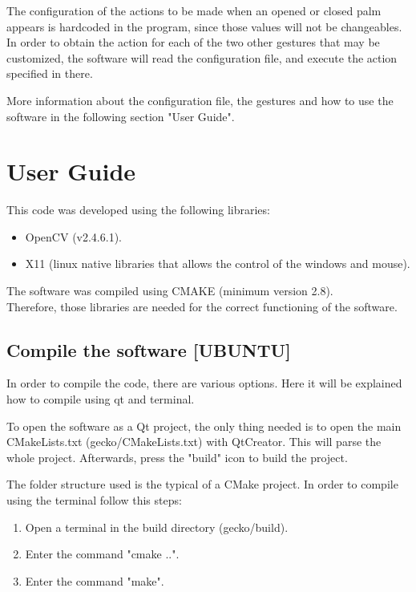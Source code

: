 \documentclass{article}
\begin{document}
\begin{center}
\end{center}

The configuration of the actions to be made when an opened or closed palm appears is hardcoded in the program, since those values will not be changeables. In order to obtain the action for each of the two other gestures that may be customized, the software will read the configuration file, and execute the action specified in there. 

More information about the configuration file, the gestures and how to use the software in the following section "User Guide". 

\section{User Guide}
This code was developed using the following libraries: 
\begin{itemize}
\item OpenCV (v2.4.6.1).
\item X11 (linux native libraries that allows the control of the windows and mouse). 
\end{itemize}
The software was compiled using CMAKE (minimum version 2.8).
\\[0.5cm]
Therefore, those libraries are needed for the correct functioning of the software. 


\subsection{Compile the software [UBUNTU]}

In order to compile the code, there are various options. Here it will be explained how to compile using qt and terminal. 

To open the software as a Qt project, the only thing needed is to open the main CMakeLists.txt (gecko/CMakeLists.txt) with QtCreator. This will parse the whole project. 
Afterwards, press the "build" icon to build the project. 


The folder structure used is the typical of a CMake project. In order to compile using the terminal follow this steps: 
\begin{enumerate}
 \item Open a terminal in the build directory (gecko/build). 
 \item Enter the command "cmake ..". 
 \item Enter the command "make". 
\end{enumerate}
\end{document}
